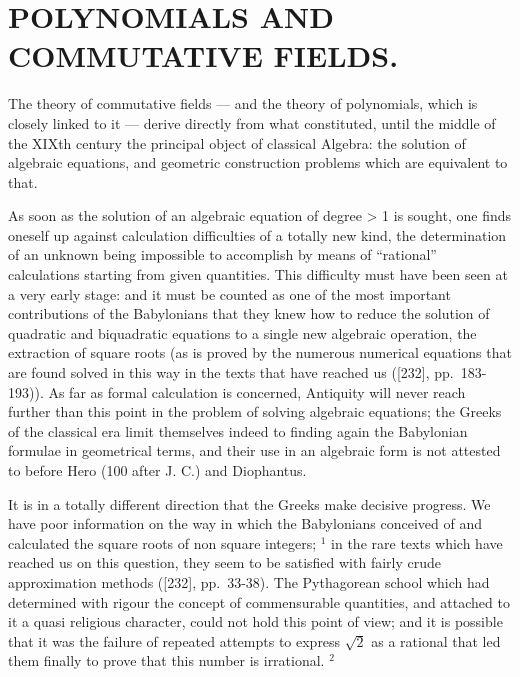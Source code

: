 \chapter{POLYNOMIALS AND COMMUTATIVE FIELDS.}

The theory of commutative fields --- and the theory of polynomials, which is closely linked to it --- derive directly from what constituted, until the middle of the XIXth century the principal object of classical Algebra: the solution of algebraic equations, and geometric construction problems which are equivalent to that.

As soon as the solution of an algebraic equation of degree \textgreater{} 1 is sought, one finds oneself up against calculation difficulties of a totally new kind, the determination of an unknown being impossible to accomplish by means of ``rational'' calculations starting from given quantities. This difficulty must have been seen at a very early stage: and it must be counted as one of the most important contributions of the Babylonians that they knew how to reduce the solution of quadratic and biquadratic equations to a single new algebraic operation, the extraction of square roots (as is proved by the numerous numerical equations that are found solved in this way in the texts that have reached us ({[}232{]}, pp.~183-193)). As far as formal calculation is concerned, Antiquity will never reach further than this point in the problem of solving algebraic equations; the Greeks of the classical era limit themselves indeed to finding again the Babylonian formulae in geometrical terms, and their use in an algebraic form is not attested to before Hero (100 after J. C.) and Diophantus.

It is in a totally different direction that the Greeks make decisive progress. We have poor information on the way in which the Babylonians conceived of and calculated the square roots of non square integers; \(^{1}\) in the rare texts which have reached us on this question, they seem to be satisfied with fairly crude approximation methods ({[}232{]}, pp.~33-38). The Pythagorean school which had determined with rigour the concept of commensurable quantities, and attached to it a quasi religious character, could not hold this point of view; and it is possible that it was the failure of repeated attempts to express \(\sqrt{2}\) as a rational that led them finally to prove that this number is irrational. \(^{2}\)

